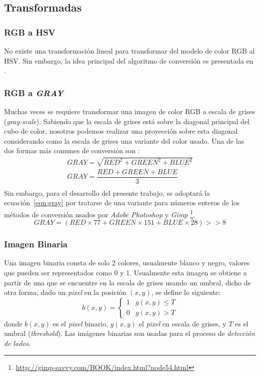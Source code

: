   \subsection{Transformadas}
  	\subsubsection{RGB a HSV}
  		No existe una transformación lineal para transformar del modelo de color
  		RGB al HSV. Sin embargo, la idea principal del algoritmo de conversión 
  		es presentada en \cite{Eugene:Color}.
    \subsubsection{RGB a \textit{GRAY}}
      Muchas veces se requiere transformar una imagen de color RGB a escala 
      de grises (\textit{gray-scale}). Sabiendo que la escala de grises está 
      sobre la diagonal principal del cubo de color, nosotros podemos realizar 
      una proyección sobre esta diagonal considerando como la escala de grises
      una variante del color usado.
  		Una de las dos formas más comunes de conversión son \cite{GRAY7:web}:
      \begin{eqnarray}
	      GRAY = \sqrt{RED^2 + GREEN^2 + BLUE^2}\\
	      GRAY = \dfrac{RED + GREEN + BLUE}{3}\\
      \end{eqnarray}
      Sin embargo, para el desarrollo del presente trabajo, se adoptará la 
      ecuación~\ref{eqn:gray} por tratarse de una variante para números 
      enteros\cite{GRAYused:web} de los métodos de conversión usados por 
      \textit{Adobe Photoshop} y \textit{Gimp}
      \footnote{\url{http://gimp-savvy.com/BOOK/index.html?node54.html}}.
      \begin{equation}
      GRAY = (RED \times 77 + GREEN \times 151 + BLUE \times 28 ) >> 8
      \label{eqn:gray}
      \end{equation}
      
    \subsubsection{Imagen Binaria}
      Una imagen binaria consta de solo 2 colores, usualmente blanco y negro, 
      valores que pueden ser representados como 0 y 1. Usualmente esta imagen 
      se obtiene a partir de una que se encuentre en la escala de grises 
      usando un umbral, dicho de otra forma, dado un \textit{pixel} en la 
      posición $(x,y)$, se define lo siguiente:
      \[
        b(x,y) =
        \begin{cases}
          1 & g(x,y) \leq T \\
          0 & g(x,y) > T
        \end{cases}
      \]
      donde $b(x,y)$ es el \textit{pixel} binario, $g(x,y)$ el \textit{pixel} 
      en escala de grises, y $T$ es el umbral (\textit{threshold}).
      Las imágenes binarias son usadas para el proceso de \textit{detección de
      lados}.
